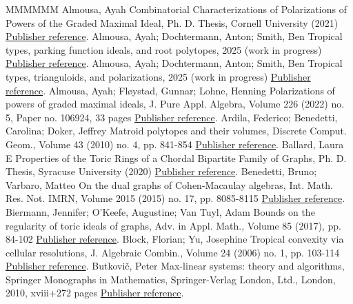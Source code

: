 \documentclass[11pt]{article}
\theoremstyle{definition}
\numberwithin{equation}{section}
\begin{document}
\begin{thebibliography}{MMMMMM}
 Almousa, Ayah Combinatorial Characterizations of Polarizations of Powers of the Graded Maximal Ideal, Ph. D. Thesis, Cornell University (2021) \href{https://alco.centre-mersenne.org/articles/10.5802/alco.404/#almousa2021combinatorial}{Publisher reference}.
 Almousa, Ayah; Dochtermann, Anton; Smith, Ben Tropical types, parking function ideals, and root polytopes, 2025 (work in progress) \href{https://alco.centre-mersenne.org/articles/10.5802/alco.404/#ADSparking}{Publisher reference}.
 Almousa, Ayah; Dochtermann, Anton; Smith, Ben Tropical types, trianguloids, and polarizations, 2025 (work in progress) \href{https://alco.centre-mersenne.org/articles/10.5802/alco.404/#ADSpolarizations}{Publisher reference}.
 Almousa, Ayah; Fløystad, Gunnar; Lohne, Henning Polarizations of powers of graded maximal ideals, J. Pure Appl. Algebra, Volume 226 (2022) no. 5, Paper no. 106924, 33 pages \href{https://alco.centre-mersenne.org/articles/10.5802/alco.404/#almousa2019polarizations}{Publisher reference}.
 Ardila, Federico; Benedetti, Carolina; Doker, Jeffrey Matroid polytopes and their volumes, Discrete Comput. Geom., Volume 43 (2010) no. 4, pp. 841-854 \href{https://alco.centre-mersenne.org/articles/10.5802/alco.404/#ArdBenDok}{Publisher reference}.
 Ballard, Laura E Properties of the Toric Rings of a Chordal Bipartite Family of Graphs, Ph. D. Thesis, Syracuse University (2020) \href{https://alco.centre-mersenne.org/articles/10.5802/alco.404/#ballard2021properties}{Publisher reference}.
 Benedetti, Bruno; Varbaro, Matteo On the dual graphs of Cohen-Macaulay algebras, Int. Math. Res. Not. IMRN, Volume 2015 (2015) no. 17, pp. 8085-8115 \href{https://alco.centre-mersenne.org/articles/10.5802/alco.404/#BenVar}{Publisher reference}.
 Biermann, Jennifer; O’Keefe, Augustine; Van Tuyl, Adam Bounds on the regularity of toric ideals of graphs, Adv. in Appl. Math., Volume 85 (2017), pp. 84-102 \href{https://alco.centre-mersenne.org/articles/10.5802/alco.404/#BieOkeVan17}{Publisher reference}.
 Block, Florian; Yu, Josephine Tropical convexity via cellular resolutions, J. Algebraic Combin., Volume 24 (2006) no. 1, pp. 103-114 \href{https://alco.centre-mersenne.org/articles/10.5802/alco.404/#block2006tropical}{Publisher reference}.
 Butkovič, Peter Max-linear systems: theory and algorithms, Springer Monographs in Mathematics, Springer-Verlag London, Ltd., London, 2010, xviii+272 pages \href{https://alco.centre-mersenne.org/articles/10.5802/alco.404/#butkovic}{Publisher reference}.

\end{thebibliography}
\end{document}
